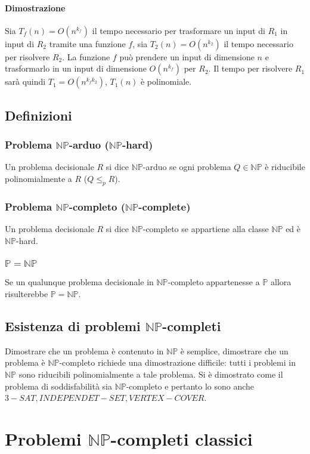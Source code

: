 \paragraph{Dimostrazione}
Sia $T_f(n)=O(n^{k_f})$ il tempo necessario per trasformare un input di $R_1$ in input di $R_2$ tramite una funzione $f$, sia $T_2(n)=O(n^{k_2})$ il tempo necessario per risolvere $R_2$.
La funzione $f$ pu\`o prendere un input di dimensione $n$ e trasformarlo in un input di dimensione $O(n^{k_f})$ per $R_2$. Il tempo per risolvere $R_1$ sar\`a quindi $T_1=O(n^{k_fk_2})$,
$T_1(n)$ \`e polinomiale.
\subsection{Definizioni}
\subsubsection{Problema $\mathbf{\mathbb{NP}}$-arduo ($\mathbf{\mathbb{NP}}$-hard)}
Un problema decisionale $R$ si dice $\mathbb{NP}$-arduo se ogni problema $Q\in\mathbb{NP}$ \`e riducibile polinomialmente a $R$ ($Q\le_p R$).
\subsubsection{Problema $\mathbf{\mathbb{NP}}$-completo ($\mathbf{\mathbb{NP}}$-complete)}
Un problema decisionale $R$ si dice $\mathbb{NP}$-completo se appartiene alla classe $\mathbb{NP}$ ed \`e $\mathbb{NP}$-hard.
\subsubsection{$\mathbf{\mathbb{P}=\mathbb{NP}}$}
Se un qualunque problema decisionale in $\mathbb{NP}$-completo appartenesse a $\mathbb{P}$ allora risulterebbe $\mathbb{P}=\mathbb{NP}$.
\subsection{Esistenza di problemi $\mathbf{\mathbb{NP}}$-completi}
Dimostrare che un problema \`e contenuto in $\mathbb{NP}$ \`e semplice, dimostrare che un problema \`e $\mathbb{NP}$-completo richiede una dimostrazione difficile: tutti i problemi in
$\mathbb{NP}$ sono riducibili polinomialmente a tale problema. Si \`e dimostrato come il problema di soddisfabilit\`a sia $\mathbb{NP}$-completo e pertanto lo sono anche $3-SAT, 
INDEPENDET-SET, VERTEX-COVER$.
\section{Problemi $\mathbf{\mathbb{NP}}$-completi classici}
